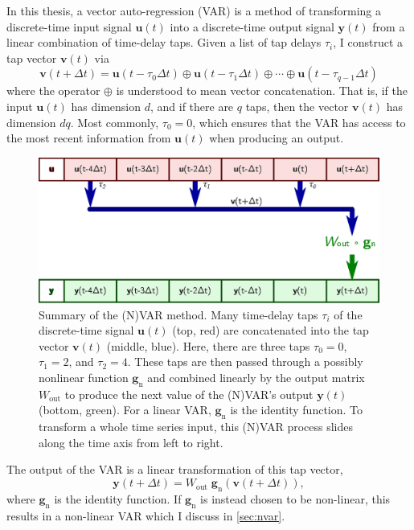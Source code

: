 In this thesis, a vector auto-regression (VAR) is a method of
transforming a discrete-time input signal $\bm{u}(t)$ into a
discrete-time output signal $\bm{y}(t)$ from a linear combination of
time-delay taps. Given a list of tap delays $\tau_i$, I construct
a tap vector $\bm{v}(t)$ via
\begin{equation}
  \label{eq:var-v}
  \bm{v}(t + \Delta t) = \bm{u}(t - \tau_0 \Delta t) \oplus \bm{u}(t - \tau_1 \Delta t) \oplus \cdots \oplus \bm{u}(t - \tau_{q-1} \Delta t)
\end{equation}
where the operator $\oplus$ is understood to mean vector
concatenation. That is, if the input $\bm{u}(t)$ has dimension $d$,
and if there are $q$ taps, then the vector $\bm{v}(t)$ has dimension
$dq$. Most commonly, $\tau_0 = 0$, which ensures that the VAR has access to the most recent information from $\bm{u}(t)$ when producing an output.

\begin{figure}
  \includegraphics{figures/var-infer}
    \caption{Summary of the (N)VAR method. Many time-delay taps $\tau_i$
    of the discrete-time signal $\bm{u}(t)$ (top, red) are concatenated into the tap
    vector $\bm{v}(t)$ (middle, blue). Here, there are three taps
    $\tau_0=0$, $\tau_1=2$, and $\tau_2=4$. These taps are then passed
    through a possibly nonlinear function $\bm{g}_\text{n}$ and
    combined linearly by the output matrix $W_\text{out}$ to produce
    the next value of the (N)VAR's output $\bm{y}(t)$ (bottom,
    green). For a linear VAR, $\bm{g}_\text{n}$ is the identity
    function. To transform a whole time series input, this (N)VAR process
    slides along the time axis from left to right.}
  \label{fig:var-infer}
\end{figure}

The output of the VAR is a linear transformation of this tap vector,
\begin{equation}
  \label{eq:var-y}
  \bm{y}(t + \Delta t) = W_\text{out}\;\bm{g}_\text{n}\left(\bm{v}(t + \Delta t)\right),
\end{equation}
where $\bm{g}_\text{n}$ is the identity function. If $\bm{g}_\text{n}$
is instead chosen to be non-linear, this results in a non-linear VAR
which I discuss in \cref{sec:nvar}.

